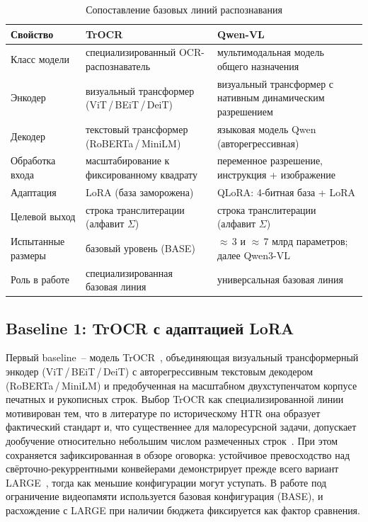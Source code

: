 \documentclass[a4paper,12pt]{extarticle}
\begin{document}
\begin{table}[htbp]
\centering
\caption{Сопоставление базовых линий распознавания}
\label{tab:baselines}
\small
\begin{tabular}{p{3.0cm} p{4.6cm} p{4.6cm}}
\hline
\textbf{Свойство} & \textbf{TrOCR} & \textbf{Qwen-VL} \\
\hline
Класс модели & специализированный OCR-распознаватель & мультимодальная модель общего назначения \\
Энкодер & визуальный трансформер (ViT\,/\,BEiT\,/\,DeiT) & визуальный трансформер с нативным динамическим разрешением \\
Декодер & текстовый трансформер (RoBERTa\,/\,MiniLM) & языковая модель Qwen (авторегрессивная) \\
Обработка входа & масштабирование к фиксированному квадрату & переменное разрешение, инструкция + изображение \\
Адаптация & LoRA (база заморожена) & QLoRA: 4-битная база + LoRA \\
Целевой выход & строка транслитерации (алфавит $\Sigma$) & строка транслитерации (алфавит $\Sigma$) \\
Испытанные размеры & базовый уровень (BASE) & $\approx$\,3 и $\approx$\,7 млрд параметров; далее Qwen3-VL \\
Роль в работе & специализированная базовая линия & универсальная базовая линия \\
\hline
\end{tabular}
\end{table}
 
 
\subsection{Baseline 1: TrOCR с адаптацией LoRA}
\label{sec:method-trocr}
 
Первый baseline~-- модель TrOCR~\cite{li2023}, объединяющая визуальный трансформерный энкодер (ViT\,/\,BEiT\,/\,DeiT) с авторегрессивным текстовым декодером (RoBERTa\,/\,MiniLM) и предобученная на масштабном двухступенчатом корпусе печатных и рукописных строк. Выбор TrOCR как специализированной линии мотивирован тем, что в литературе по историческому HTR она образует фактический стандарт и, что существеннее для малоресурсной задачи, допускает дообучение относительно небольшим числом размеченных строк~\cite{strobel2022,vogler2022}. При этом сохраняется зафиксированная в обзоре оговорка: устойчивое превосходство над свёрточно-рекуррентными конвейерами демонстрирует прежде всего вариант LARGE~\cite{strobel2023}, тогда как меньшие конфигурации могут уступать. В работе под ограничение видеопамяти используется базовая конфигурация (BASE), и расхождение с LARGE при наличии бюджета фиксируется как фактор сравнения.
 
\end{document}
